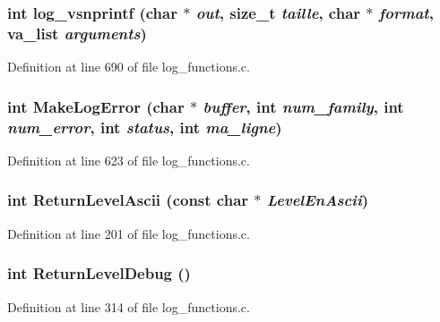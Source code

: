 \subsubsection[{log\_\-vsnprintf}]{\setlength{\rightskip}{0pt plus 5cm}int log\_\-vsnprintf (char $\ast$ {\em out}, \/  size\_\-t {\em taille}, \/  char $\ast$ {\em format}, \/  va\_\-list {\em arguments})}\label{log__functions_8c_a153252e2eb446698ace7578b7d89869b}


Definition at line 690 of file log\_\-functions.c.
\subsubsection[{MakeLogError}]{\setlength{\rightskip}{0pt plus 5cm}int MakeLogError (char $\ast$ {\em buffer}, \/  int {\em num\_\-family}, \/  int {\em num\_\-error}, \/  int {\em status}, \/  int {\em ma\_\-ligne})}\label{log__functions_8c_a7b7cda88eb36712c6a5e1dc63acab6dc}


Definition at line 623 of file log\_\-functions.c.
\subsubsection[{ReturnLevelAscii}]{\setlength{\rightskip}{0pt plus 5cm}int ReturnLevelAscii (const char $\ast$ {\em LevelEnAscii})}\label{log__functions_8c_ad6c63af5bd82d8eed2586f8c1af13871}


Definition at line 201 of file log\_\-functions.c.
\subsubsection[{ReturnLevelDebug}]{\setlength{\rightskip}{0pt plus 5cm}int ReturnLevelDebug ()\hspace{0.3cm}{\ttfamily  [inline]}}\label{log__functions_8c_af8398d36dc7460b89d877e64e81abc7b}


Definition at line 314 of file log\_\-functions.c.
